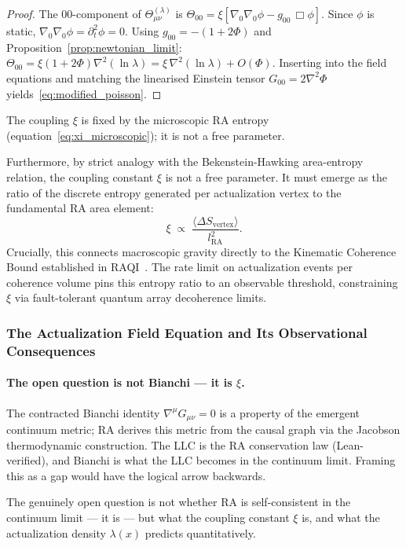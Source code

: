 \documentclass[11pt,a4paper]{article}
\theoremstyle{plain}
\theoremstyle{definition}
\theoremstyle{remark}
\begin{document}
\begin{description}
\begin{proof}
The $00$-component of $\Theta_{\mu\nu}^{(\lambda)}$ is
$\Theta_{00} = \xi[\nabla_0\nabla_0\phi - g_{00}\,\Box\phi]$.
Since $\phi$ is static, $\nabla_0\nabla_0\phi = \partial_t^2\phi = 0$.
Using $g_{00} = -(1+2\Phi)$ and Proposition~\ref{prop:newtonian_limit}:
$\Theta_{00} = \xi(1+2\Phi)\nabla^2(\ln\lambda) = \xi\,\nabla^2(\ln\lambda) + O(\Phi)$.
Inserting into the field equations and matching the linearised Einstein tensor
$G_{00} = 2\nabla^2\Phi$ yields~\eqref{eq:modified_poisson}.
\end{proof}

\noindent
The coupling $\xi$ is fixed by the microscopic RA entropy
(equation~\eqref{eq:xi_microscopic}); it is not a free parameter.

Furthermore, by strict analogy with the Bekenstein-Hawking area-entropy
relation, the coupling constant $\xi$ is not a free parameter. It must emerge
as the ratio of the discrete entropy generated per actualization vertex to the
fundamental RA area element:
\begin{equation}
  \xi \;\propto\; \frac{\langle\Delta S_{\mathrm{vertex}}\rangle}{l_{\mathrm{RA}}^2}.
  \label{eq:xi_microscopic}
\end{equation}
Crucially, this connects macroscopic gravity directly to the Kinematic Coherence
Bound established in RAQI~\citep{Sandeman2026RAQI}. The rate limit on
actualization events per coherence volume pins this entropy ratio to an
observable threshold, constraining $\xi$ via fault-tolerant quantum array
decoherence limits.

\subsubsection*{The Actualization Field Equation and Its Observational Consequences}

\paragraph{The open question is not Bianchi — it is $\xi$.}
The contracted Bianchi identity $\nabla^\mu G_{\mu\nu} = 0$ is a property of
the emergent continuum metric; RA derives this metric from the causal graph via
the Jacobson thermodynamic construction. The LLC is the RA conservation law
(Lean-verified), and Bianchi is what the LLC becomes in the continuum limit.
Framing this as a gap would have the logical arrow backwards.

The genuinely open question is not whether RA is self-consistent in the continuum
limit --- it is --- but what the coupling constant $\xi$ is, and what the
actualization density $\lambda(x)$ predicts quantitatively.


\end{description}
\end{document}
